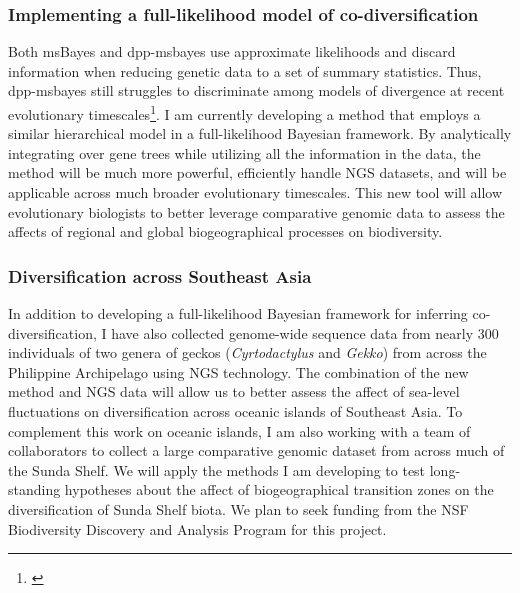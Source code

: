 \subsubsection*{Implementing a full-likelihood model of co-diversification}
Both msBayes and dpp-msbayes use approximate likelihoods and discard
information when reducing genetic data to a set of summary statistics.
Thus, dpp-msbayes still struggles to discriminate among models of divergence at
recent evolutionary timescales\footnote{\label{Oaks14dpp}}.
I am currently developing a method that employs a similar hierarchical model in
a full-likelihood Bayesian framework.
By analytically integrating over gene trees while utilizing all the information
in the data, the method will be much more powerful, efficiently handle NGS
datasets, and will be applicable across much broader evolutionary timescales.
This new tool will allow evolutionary biologists to better leverage comparative
genomic data to assess the affects of regional and global biogeographical
processes on biodiversity.

\subsubsection*{Diversification across Southeast Asia}
In addition to developing a full-likelihood Bayesian framework for inferring
co-diversification, I have also collected genome-wide sequence data from nearly
300 individuals of two genera of geckos (\emph{Cyrtodactylus} and \emph{Gekko})
from across the Philippine Archipelago using NGS technology.
The combination of the new method and NGS data will allow us to better assess
the affect of sea-level fluctuations on diversification across oceanic islands
of Southeast Asia.
To complement this work on oceanic islands, I am also working with a team of
collaborators
to collect a large comparative genomic dataset from across much of the Sunda
Shelf.
We will apply the methods I am developing to test long-standing hypotheses
about the affect of biogeographical transition zones on the diversification of
Sunda Shelf biota.
We plan to seek funding from the NSF Biodiversity Discovery and Analysis
Program for this project.

